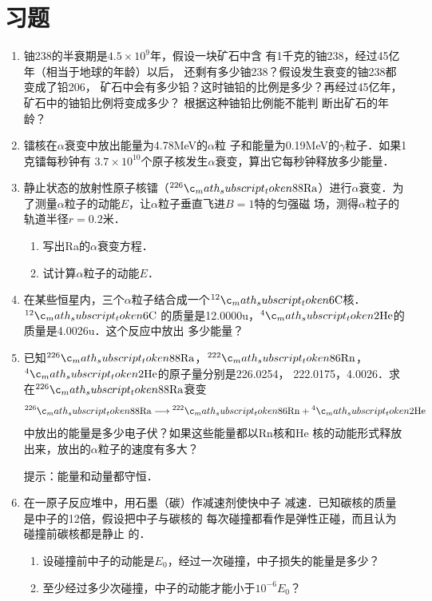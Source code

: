 \section*{习题}
\begin{enumerate}
    \item 铀238的半衰期是$4.5\times 10^9$年，假设一块矿石中含
有1千克的铀238，经过45亿年（相当于地球的年龄）以后，
还剩有多少铀238？假设发生衰变的铀238都变成了铅206，
矿石中会有多少铅？这时铀铅的比例是多少？再经过45亿年，
矿石中的铀铅比例将变成多少？ 根据这种铀铅比例能不能判
断出矿石的年龄？
\item 镭核在$\alpha$衰变中放出能量为4.78MeV的$\alpha$粒
子和能量为0.19MeV的$\gamma$粒子．如果1克镭每秒钟有
$3.7\times10^{10}$个原子核发生$\alpha$衰变，算出它每秒钟释放多少能量．
\item 静止状态的放射性原子核镭（$\atom{Ra}{226}{88}$）进行$\alpha$衰变．为
了测量$\alpha$粒子的动能$E$，让$\alpha$粒子垂直飞进$B=1$特的匀强磁
场，测得$\alpha$粒子的轨道半径$r=0.2$米．
\begin{enumerate}
    \item 写出Ra的$\alpha$衰变方程．
    \item 试计算$\alpha$粒子的动能$E$．
\end{enumerate}

\item 在某些恒星内，三个$\alpha$粒子结合成一个$\atom{C}{12}{6}$核．$\atom{C}{12}{6}$
的质量是12.0000u，$\atom{He}{4}{2}$的质量是4.0026u．这个反应中放出
多少能量？
\item 已知$\atom{Ra}{226}{88}$，$\atom{Rn}{222}{86}$，$\atom{He}{4}{2}$的原子量分别是226.0254，
222.0175，4.0026．求在$\atom{Ra}{226}{88}$衰变
\[\atom{Ra}{226}{88}\longrightarrow \atom{Rn}{222}{86}+\atom{He}{4}{2}\]
中放出的能量是多少电子伏？如果这些能量都以Rn核和He
核的动能形式释放出来，放出的$\alpha$粒子的速度有多大？

提示：能量和动量都守恒．

\item 在一原子反应堆中，用石墨（碳）作减速剂使快中子
减速．已知碳核的质量是中子的12倍，假设把中子与碳核的
每次碰撞都看作是弹性正碰，而且认为碰撞前碳核都是静止
的．
\begin{enumerate}
    \item 设碰撞前中子的动能是$E_0$，经过一次碰撞，中子损失的能量是多少？
    \item 至少经过多少次碰撞，中子的动能才能小于$10^{-6}E_0$？
\end{enumerate}

\end{enumerate}


